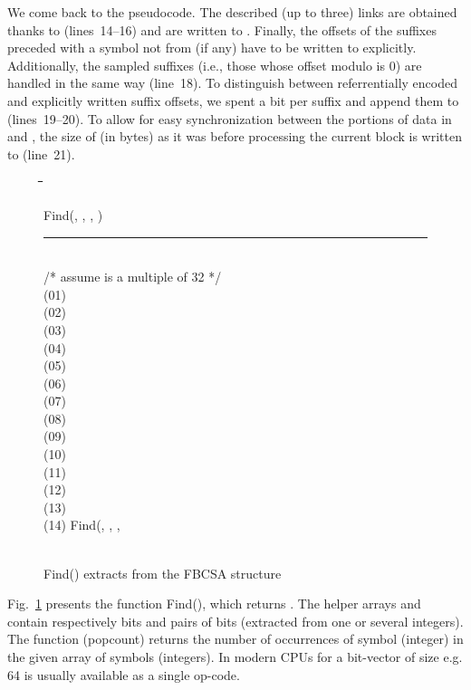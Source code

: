 \documentclass{cai}
\newcommand{\uif}{{\bf if}\xspace}
\newcommand{\uthen}{{\bf then}\xspace}
\newcommand{\uelse}{{\bf else}\xspace}
\newcommand{\ureturn}{{\bf return}\xspace}
\newcounter{lineno}
\newcommand{\utab}{\qquad}
\newcommand{\startindent}{\hspace{0.8em}}
\newenvironment{code}{\setcounter{lineno}{0}\begin{tabbing}
\utab\=\utab\=\utab\=\utab\=\utab\=\utab\=\utab\=\utab\=\utab\=\utab\=\utab\=\utab\=\utab\= \kill
}
{
\end{tabbing}\vspace{-2mm}
}
\begin{document}
We come back to the pseudocode.
The described (up to three) links are obtained thanks to 
 (lines~14--16) and are written to .
Finally, the offsets of the suffixes preceded with a symbol not from  
(if any) have to be written to  explicitly.
Additionally, the sampled suffixes (i.e., those whose offset modulo  is 0) 
are handled in the same way (line~18).
To distinguish between referrentially encoded and explicitly written 
suffix offsets, we spent a bit per suffix and append them to  
(lines~19--20).
To allow for easy synchronization between the portions of data in  
and , the size of  (in bytes) as it was before processing the 
current block is written to  (line~21).


\begin{figure}
\begin{code}
Find(, , , ) \\
\rule{\textwidth}{0.3mm} \\
/* assume  is a multiple of 32 */ \\
(01) \startindent  \\
(02) \startindent  \\
(03) \startindent  \\
(04) \startindent  \\
(05) \startindent  \\
(06) \startindent  \\
(07) \startindent  \\
(08) \startindent \uif  \uthen \\
(09) \startindent \>\>\ureturn  \\
(10) \startindent \uelse \\
(11) \startindent \>\> \\
(12) \startindent \>\> \\
(13) \startindent \>\> \\
(14) \startindent \>\>\ureturn Find(, , , \\
  \hspace{5.5em}  \\
\end{code}
\caption{Find() extracts  from the FBCSA structure}
\label{fig:FBSA_access}
\end{figure}


Fig.~\ref{fig:FBSA_access} presents the function Find(), 
which returns .
The helper arrays  and  contain respectively bits and 
pairs of bits (extracted from one or several integers).
The function  (popcount) returns the number of occurrences 
of symbol (integer)  in the given array of symbols (integers).
In modern CPUs  for a bit-vector of size e.g. 64 is usually 
available as a single op-code.
\end{document}
